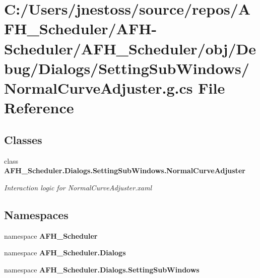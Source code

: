 \section{C\+:/\+Users/jnestoss/source/repos/\+A\+F\+H\+\_\+\+Scheduler/\+A\+F\+H-\/\+Scheduler/\+A\+F\+H\+\_\+\+Scheduler/obj/\+Debug/\+Dialogs/\+Setting\+Sub\+Windows/\+Normal\+Curve\+Adjuster.g.\+cs File Reference}
\label{_debug_2_dialogs_2_setting_sub_windows_2_normal_curve_adjuster_8g_8cs}
\subsection*{Classes}
\begin{DoxyCompactItemize}
\item 
class \textbf{ A\+F\+H\+\_\+\+Scheduler.\+Dialogs.\+Setting\+Sub\+Windows.\+Normal\+Curve\+Adjuster}
\begin{DoxyCompactList}\small\item\em Interaction logic for Normal\+Curve\+Adjuster.\+xaml \end{DoxyCompactList}\end{DoxyCompactItemize}
\subsection*{Namespaces}
\begin{DoxyCompactItemize}
\item 
namespace \textbf{ A\+F\+H\+\_\+\+Scheduler}
\item 
namespace \textbf{ A\+F\+H\+\_\+\+Scheduler.\+Dialogs}
\item 
namespace \textbf{ A\+F\+H\+\_\+\+Scheduler.\+Dialogs.\+Setting\+Sub\+Windows}
\end{DoxyCompactItemize}
